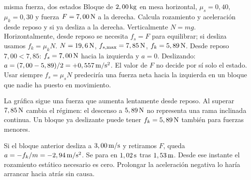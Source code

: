 \documentclass[11pt,a4paper]{article}
\begin{document}
\begin{examplebox}{misma fuerza, dos estados}
 Bloque de $2,00\,\mathrm{kg}$ en mesa horizontal,
$\mu_s=0,40$, $\mu_k=0,30$ y fuerza $F=7,00\,\mathrm{N}$ a la derecha.
Calcula rozamiento y aceleraci\'on desde reposo y si ya desliza a la derecha.
\solutionblock
{} Verticalmente $N=mg$. Horizontalmente, desde reposo se necesita
$f_s=F$ para equilibrar; si desliza usamos $f_k=\mu_kN$.
 $N=19,6\,\mathrm{N}$, $f_{s,\max}=7,85\,\mathrm{N}$, $f_k=5,89\,\mathrm{N}$.
Desde reposo $7,00<7,85$: $f_s=7,00\,\mathrm{N}$ hacia la izquierda y $a=0$.
Deslizando: $a=(7,00-5,89)/2=+0,557\,\mathrm{m/s^2}$.
 El valor de $F$ no decide por s\'i solo el estado.
Usar siempre $f_s=\mu_sN$ predecir\'ia una fuerza neta hacia la izquierda en un
bloque que nadie ha puesto en movimiento.
\begin{center}
\end{center}
La gr\'afica sigue una fuerza que aumenta lentamente desde reposo.
Al superar $7,85\,\mathrm{N}$ cambia el r\'egimen: el descenso a $5,89\,\mathrm{N}$ no representa una
rama inclinada continua. Un bloque ya deslizante puede tener $f_k=5,89\,\mathrm{N}$
tambi\'en para fuerzas menores.
\end{examplebox}

Si el bloque anterior desliza a $3,00\,\mathrm{m/s}$ y retiramos $F$, queda
$a=-f_k/m=-2,94\,\mathrm{m/s^2}$. Se para en $1,02\,\mathrm{s}$ tras $1,53\,\mathrm{m}$.
Desde ese instante el rozamiento est\'atico necesario es cero.
Prolongar la aceleraci\'on negativa lo har\'ia arrancar hacia atr\'as sin causa.
\end{document}
